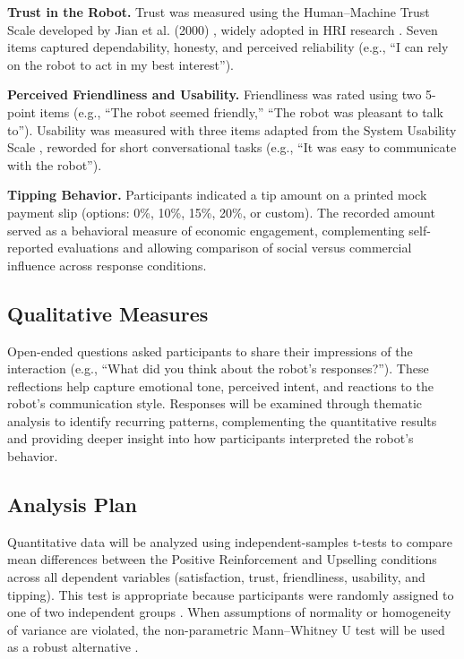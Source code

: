 \documentclass[conference]{IEEEtran}
\begin{document}
\textbf{Trust in the Robot.} Trust was measured using the Human–Machine Trust Scale developed by Jian et al. (2000) \cite{b28}, widely adopted in HRI research \cite{b29, b30}. Seven items captured dependability, honesty, and perceived reliability (e.g., ``I can rely on the robot to act in my best interest'').

\textbf{Perceived Friendliness and Usability.} Friendliness was rated using two 5-point items (e.g., ``The robot seemed friendly,'' ``The robot was pleasant to talk to''). Usability was measured with three items adapted from the System Usability Scale \cite{b31}, reworded for short conversational tasks (e.g., ``It was easy to communicate with the robot'').

\textbf{Tipping Behavior.} Participants indicated a tip amount on a printed mock payment slip (options: 0\%, 10\%, 15\%, 20\%, or custom). The recorded amount served as a behavioral measure of economic engagement, complementing self-reported evaluations and allowing comparison of social versus commercial influence across response conditions.

\subsection{Qualitative Measures}
Open-ended questions asked participants to share their impressions of the interaction (e.g., ``What did you think about the robot's responses?''). These reflections help capture emotional tone, perceived intent, and reactions to the robot's communication style. Responses will be examined through thematic analysis \cite{b32} to identify recurring patterns, complementing the quantitative results and providing deeper insight into how participants interpreted the robot's behavior.

\subsection{Analysis Plan}
Quantitative data will be analyzed using independent-samples t-tests to compare mean differences between the Positive Reinforcement and Upselling conditions across all dependent variables (satisfaction, trust, friendliness, usability, and tipping). This test is appropriate because participants were randomly assigned to one of two independent groups \cite{b30}. When assumptions of normality or homogeneity of variance are violated, the non-parametric Mann–Whitney U test will be used as a robust alternative \cite{b31}.
\end{document}
